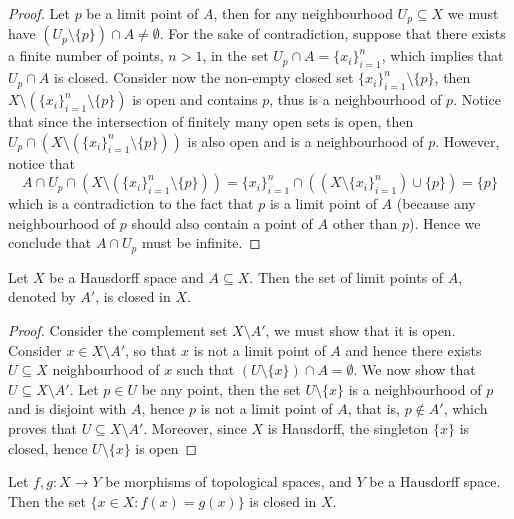 \begin{proof}
    Let \(p\) be a limit point of \(A\), then for any neighbourhood \(U_p
    \subseteq X\) we must have \((U_p \setminus \{p\}) \cap A \neq \emptyset\).
    For the sake of contradiction, suppose that there exists a finite number of
    points, \(n > 1\), in the set \(U_p \cap A = \{x_i\}_{i=1}^n\), which implies
    that \(U_p \cap A\) is closed. Consider now the non-empty closed set
    \(\{x_i\}_{i=1}^n \setminus \{p\}\), then \(X \setminus (\{x_i\}_{i=1}^n
    \setminus \{p\})\) is open and contains \(p\), thus is a neighbourhood of
    \(p\). Notice that since the intersection of finitely many open sets is open,
    then \(U_p \cap \left( X \setminus \left( \{x_i\}_{i=1}^n \setminus \{p\}
        \right) \right)\) is also open and is a neighbourhood of \(p\). However, notice
    that
    \[
        A \cap U_p \cap (X \setminus (\{x_i\}_{i=1}^n \setminus \{p\}))
        = \{x_i\}_{i=1}^n \cap ((X \setminus \{x_i\}_{i=1}^n) \cup \{p\})
        = \{p\}
    \]
    which is a contradiction to the fact that \(p\) is a limit point of \(A\)
    (because any neighbourhood of \(p\) should also contain a point of \(A\) other
    than \(p\)). Hence we conclude that \(A \cap U_p\) must be infinite.
\end{proof}

\begin{proposition}
    Let \(X\) be a Hausdorff space and \(A \subseteq X\). Then the set of limit
    points of \(A\), denoted by \(A'\), is closed in \(X\).
\end{proposition}

\begin{proof}
    Consider the complement set \(X \setminus A'\), we must show that it is open.
    Consider \(x \in X \setminus A'\), so that \(x\) is not a limit point of \(A\)
    and hence there exists \(U \subseteq X\) neighbourhood of \(x\) such that \((U
    \setminus \{x\}) \cap A = \emptyset\). We now show that \(U \subseteq X
    \setminus A'\). Let \(p \in U\) be any point, then the set \(U \setminus
    \{x\}\) is a neighbourhood of \(p\) and is disjoint with \(A\), hence \(p\) is
    not a limit point of \(A\), that is, \(p \not\in A'\), which proves that \(U
    \subseteq X \setminus A'\). Moreover, since \(X\) is Hausdorff, the singleton
    \(\{x\}\) is closed, hence \(U \setminus \{x\}\) is open
\end{proof}

\begin{proposition}
    Let \(f,g : X \to Y\) be morphisms of topological spaces, and \(Y\) be a
    Hausdorff space. Then the set \(\{x \in X \colon f(x) = g(x)\}\) is closed in
    \(X\).
\end{proposition}

